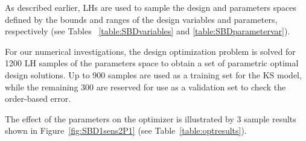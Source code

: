 As described earlier, \acp{LH} are used to sample the design and parameters spaces defined by the bounds and ranges of the design variables and parameters, respectively (see Tables 
~\ref{table:SBDvariables} and \ref{table:SBDparametervar}).

For our numerical investigations, the design optimization problem is solved for 1200 \ac{LH} samples of the parameters space to obtain a set of parametric optimal design solutions. Up to 900 samples are used as a training set for the \ac{KS} model, while the remaining 300 are reserved for use as a validation set to check the order-based error.

The effect of the parameters on the optimizer is illustrated by 3 sample results shown in Figure~\ref{fig:SBD1sens2P1} (see Table~\ref{table:optresults}).

